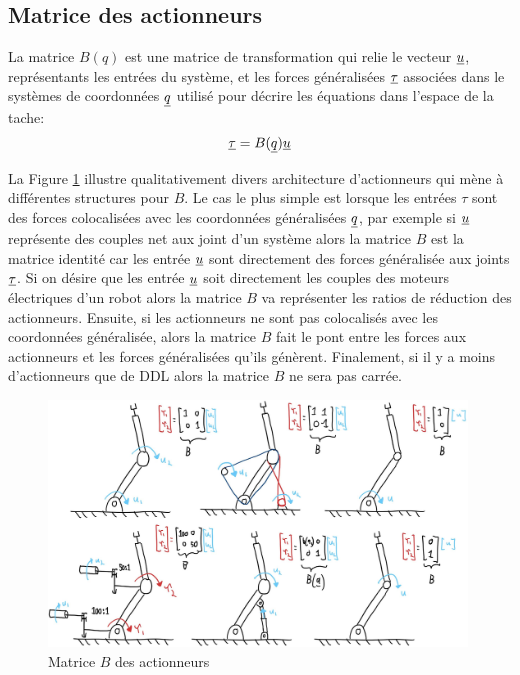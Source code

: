 \subsection{Matrice des actionneurs}

La matrice $B(q)$ est une matrice de transformation qui relie le vecteur $\underline{u}$,  représentants les entrées du système, et les forces généralisées $\underline{\tau}$ associées dans le systèmes de coordonnées $\underline{q}$ utilisé pour décrire les équations dans l'espace de la tache:
\begin{align}
\underline{\tau} =  B(\underline{q})  \underline{u} 
\end{align}


La Figure \ref{fig:actuatormatrix} illustre qualitativement divers architecture d'actionneurs qui mène à différentes structures pour $B$. Le cas le plus simple est lorsque les entrées $\tau$ sont des forces colocalisées avec les coordonnées généralisées $\underline{q}$, par exemple si $\underline{u}$ représente des couples net aux joint d'un système alors la matrice $B$ est la matrice identité car les entrée $\underline{u}$ sont directement des forces généralisée aux joints $\underline{\tau}$. Si on désire que les entrée $\underline{u}$ soit directement les couples des moteurs électriques d'un robot alors la matrice $B$ va représenter les ratios de réduction des actionneurs. Ensuite, si les actionneurs ne sont pas colocalisés avec les coordonnées généralisée, alors la matrice $B$ fait le pont entre les forces aux actionneurs et les forces généralisées qu'ils génèrent. Finalement, si il y a moins d'actionneurs que de DDL alors la matrice $B$ ne sera pas carrée. 
\begin{figure}[ht]
	\centering
		\includegraphics[width=0.99\textwidth]{fig/actuatormatrix.jpg}
	\caption{Matrice $B$ des actionneurs}%
	\label{fig:actuatormatrix}
\end{figure}

